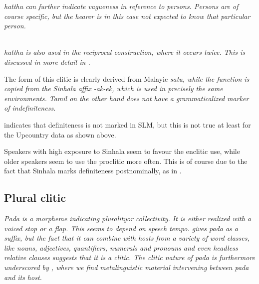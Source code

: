 \em hatthu \em can further indicate vagueness in reference to persons. Persons are of course specific, but the hearer is in this case not expected to know that particular person.

\\ 
  
\em hatthu \em is also used in the reciprocal construction, where it occurs twice. This is discussed in more detail in  .


%



%  





The form of this clitic is clearly derived from Malayic \em*satu\em, while the function is copied from the Sinhala affix \em -ak\Tilde-ek\em, which is used in precisely the same environments. Tamil on the other hand does not have a grammaticalized marker of indefiniteness.

\citet[14]{SmithRH} indicates that definiteness is not marked in SLM, but this is not true at least for the Upcountry data as shown above.

Speakers with high exposure to Sinhala seem to favour the enclitic use, while older speakers seem to use the proclitic more often. This is of course due to the fact that Sinhala marks definiteness postnominally, as in .

\subsection{Plural clitic}\label{sec:morph:Pluralclitic}
\em Pada \em is a morpheme indicating pluralityor collectivity. It is either realized with a voiced stop or a flap. This seems to depend on speech tempo.
\citet[14]{Ansaldo2005ms} gives \em pada \em as a suffix, but the fact that it can combine with hosts from a variety of word classes, like  nouns, adjectives, quantifiers, numerals and pronouns and even headless relative clauses suggests that it is a clitic. The clitic nature of \em pada \em is furthermore underscored by , where we find metalinguistic material intervening between \em pada \em and its host.

